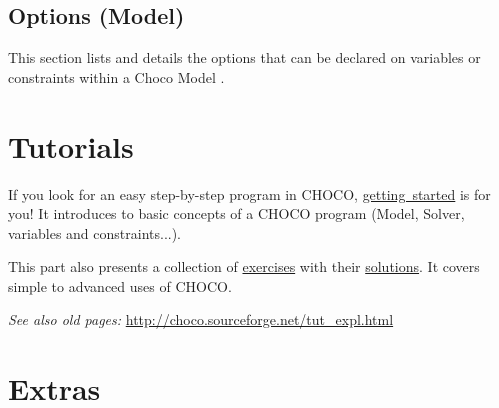 












%




























\chapter{Options (Model)}\label{ch:options}\hypertarget{ch:options}{}
This section lists and details the options that can be declared on variables or constraints within a Choco Model .


\part{Tutorials}\label{ch:tut}\hypertarget{ch:tut}{}
If you look for an easy step-by-step program in CHOCO, \hyperlink{gettingstarted}{getting\ started} is for you! It introduces to basic concepts of a CHOCO program (Model, Solver, variables and constraints...).

This part also presents a collection of \hyperlink{exercises}{exercises} with their \hyperlink{solutions}{solutions}. It covers simple to advanced uses of CHOCO.

\emph{See also old pages:} \url{http://choco.sourceforge.net/tut\_expl.html}





\part{Extras}\label{ch:extra}\hypertarget{ch:extra}{}


